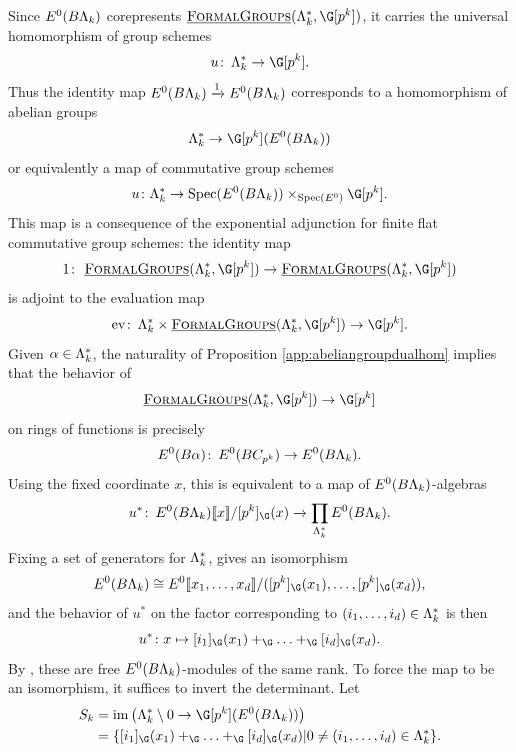 Since \(E^0(B\Lambda_k)\) corepresents \(\InternalHom{FormalGroups}(\Lk^*,\G[p^k])\), it carries the universal homomorphism of group schemes
\[
u \co \Lk^* \rightarrow \G[p^k].
\]
Thus the identity map \(E^0(B\Lambda_k) \xrightarrow{1} E^0(B\Lambda_k)\) corresponds to a homomorphism of abelian groups
\[
\Lk^* \rightarrow \G[p^k](E^0(B\Lk))
\]
or equivalently a map of commutative group schemes
\[
u \colon \Lk^* \rightarrow \Spec(E^0(B\Lk)) \times_{\Spec(E^0)} \G[p^k].
\]
This map is a consequence of the exponential adjunction for finite flat commutative group schemes: the identity map
\[
1 \co \InternalHom{FormalGroups}(\Lk^*,\G[p^k]) \to \InternalHom{FormalGroups}(\Lk^*,\G[p^k])
\]
is adjoint to the evaluation map
\[
\mathrm{ev} \co \Lk^* \times  \InternalHom{FormalGroups}(\Lk^*,\G[p^k]) \to \G[p^k].
\]
Given \(\alpha \in \Lambda_k^*\), the naturality of Proposition \ref{app:abeliangroupdualhom} implies that the behavior of
\[
\InternalHom{FormalGroups}(\Lk^*,\G[p^k]) \to \G[p^k]
\]
on rings of functions is precisely
\[
E^0(B\alpha) \colon\thinspace E^0(BC_{p^k}) \to E^0(B\Lambda_k).
\]
Using the fixed coordinate \(x\), this is equivalent to a map of \(E^0(B\Lambda_k)\)-algebras
\[
u^* \co E^0(B\Lk)\ps{x}/[p^k]_{\G}(x) \xrightarrow{} \prod_{\Lk^*} E^0(B\Lk).
\]
Fixing a set of generators for \(\Lambda_k^*\), gives an isomorphism
\[
E^0(B\Lk) \cong E^0\ps{x_1, \ldots, x_d}/([p^k]_{\G}(x_1), \ldots, [p^k]_{\G}(x_d)),
\]
and the behavior of \(u^*\) on the factor corresponding to \((i_1, \ldots, i_d) \in \Lambda_k^*\) is then
\[
u^* \colon x \mapsto [i_1]_{\G}(x_1)+_{\G} \ldots +_{\G} [i_d]_{\G}(x_d).
\]
By , these are free \(E^0(B\Lambda_k)\)-modules of the same rank.
To force the map to be an isomorphism, it suffices to invert the determinant.
Let
\begin{align*}
S_k &= \im \big (\Lk^* \setminus 0 \rightarrow \G[p^k](E^0(B\Lk)) \big ) \\ &= \{ [i_1]_{\G}(x_1)+_{\G} \ldots +_{\G} [i_d]_{\G}(x_d)| 0 \neq (i_1, \ldots, i_d) \in \Lk^* \}.
\end{align*}

